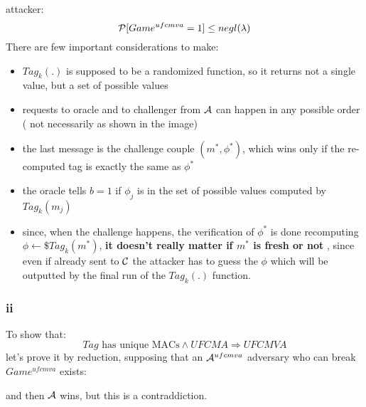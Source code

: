 \documentclass[11pt]{article}
\newcounter{t0d0_counter}
\begin{document}
attacker:
\[
    \P [ Game^{ufcmva}=1 ] \leq negl(\lambda)  
\]
There are few important considerations to make:
\begin{itemize}
    \item $Tag_{k}(.)$ is supposed to be a randomized function, so it returns
        not a single value, but a set of possible values
    \item requests to oracle and to challenger from $\A$ can happen in any
        possible order ( not necessarily as shown in the image)
    \item the last message is the challenge couple $(m^{*}, \phi^{*})$, which
            wins only if the re-computed tag is exactly the same as $\phi^{*}$
    \item the oracle tells $b=1$ if $\phi_{j}$ is in the set of possible values
        computed by $Tag_{k}(m_{j})$
    \item since, when the challenge happens, the verification of $\phi^{*}$ is
        done recomputing $\phi \leftarrow\$ Tag_{k}(m^{*})$, 
        \textbf{it doesn't really matter if $m^{*}$ is fresh or not} , since even if
        already sent to $\C$ the attacker has to guess the $\phi$ which will be
        outputted by the final run of the $Tag_{k}(.)$ function.
\end{itemize}
\subsubsection{ ii }
To show that:
\[
   Tag \text{ has unique MACs} \wedge UFCMA \Rightarrow UFCMVA
\]
 let's prove it by reduction, supposing that an $\A^{ufcmva}$ adversary who can
 break $Game^{ufcmva}$ exists:

\begin{figure}[h!]
   \centering
   \sdinit{}
\end{figure}
and then $\A$ wins, but this is a contraddiction.\\
\end{document}
